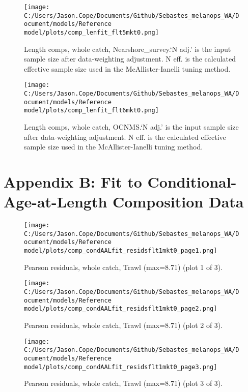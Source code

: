 \documentclass[11pt,
  english,
  letterpaper,
]{article}
\begin{document}
\begin{figure}
\centering
\texttt{[image: C:/Users/Jason.Cope/Documents/Github/Sebastes\_melanops\_WA/Document/models/Reference model/plots/comp\_lenfit\_flt5mkt0.png]}
\caption{Length comps, whole catch, Nearshore\_survey.`N adj.' is the input sample size after data-weighting adjustment. N eff. is the calculated effective sample size used in the McAllister-Ianelli tuning method.\label{fig:comp_lenfit_flt5mkt0}}
\end{figure}

\begin{figure}
\centering
\texttt{[image: C:/Users/Jason.Cope/Documents/Github/Sebastes\_melanops\_WA/Document/models/Reference model/plots/comp\_lenfit\_flt6mkt0.png]}
\caption{Length comps, whole catch, OCNMS.`N adj.' is the input sample size after data-weighting adjustment. N eff. is the calculated effective sample size used in the McAllister-Ianelli tuning method.\label{fig:comp_lenfit_flt6mkt0}}
\end{figure}

\clearpage

\hypertarget{app-b}{%
\section{Appendix B: Fit to Conditional-Age-at-Length Composition Data}\label{app-b}}

\begin{figure}
\centering
\texttt{[image: C:/Users/Jason.Cope/Documents/Github/Sebastes\_melanops\_WA/Document/models/Reference model/plots/comp\_condAALfit\_residsflt1mkt0\_page1.png]}
\caption{Pearson residuals, whole catch, Trawl (max=8.71) (plot 1 of 3).\label{fig:comp_condAALfit_residsflt1mkt0_page1}}
\end{figure}

\begin{figure}
\centering
\texttt{[image: C:/Users/Jason.Cope/Documents/Github/Sebastes\_melanops\_WA/Document/models/Reference model/plots/comp\_condAALfit\_residsflt1mkt0\_page2.png]}
\caption{Pearson residuals, whole catch, Trawl (max=8.71) (plot 2 of 3).\label{fig:comp_condAALfit_residsflt1mkt0_page2}}
\end{figure}

\begin{figure}
\centering
\texttt{[image: C:/Users/Jason.Cope/Documents/Github/Sebastes\_melanops\_WA/Document/models/Reference model/plots/comp\_condAALfit\_residsflt1mkt0\_page3.png]}
\caption{Pearson residuals, whole catch, Trawl (max=8.71) (plot 3 of 3).\label{fig:comp_condAALfit_residsflt1mkt0_page3}}
\end{figure}
\end{document}
